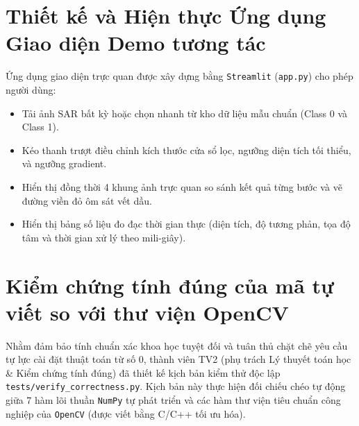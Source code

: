 \section{Thiết kế và Hiện thực Ứng dụng Giao diện Demo tương tác}
\label{sec:demo_app_design}
Ứng dụng giao diện trực quan được xây dựng bằng \texttt{Streamlit} (\texttt{app.py}) cho phép người dùng:
\begin{itemize}
    \item Tải ảnh SAR bất kỳ hoặc chọn nhanh từ kho dữ liệu mẫu chuẩn (Class 0 và Class 1).
    \item Kéo thanh trượt điều chỉnh kích thước cửa sổ lọc, ngưỡng diện tích tối thiểu, và ngưỡng gradient.
    \item Hiển thị đồng thời 4 khung ảnh trực quan so sánh kết quả từng bước và vẽ đường viền đỏ ôm sát vết dầu.
    \item Hiển thị bảng số liệu đo đạc thời gian thực (diện tích, độ tương phản, tọa độ tâm và thời gian xử lý theo mili-giây).
\end{itemize}

\section{Kiểm chứng tính đúng của mã tự viết so với thư viện OpenCV}
\label{sec:verification}
Nhằm đảm bảo tính chuẩn xác khoa học tuyệt đối và tuân thủ chặt chẽ yêu cầu tự lực cài đặt thuật toán từ số 0, thành viên TV2 (phụ trách Lý thuyết toán học \& Kiểm chứng tính đúng) đã thiết kế kịch bản kiểm thử độc lập \texttt{tests/verify\_correctness.py}. Kịch bản này thực hiện đối chiếu chéo tự động giữa 7 hàm lõi thuần \texttt{NumPy} tự phát triển và các hàm thư viện tiêu chuẩn công nghiệp của \texttt{OpenCV} (được viết bằng C/C++ tối ưu hóa).

